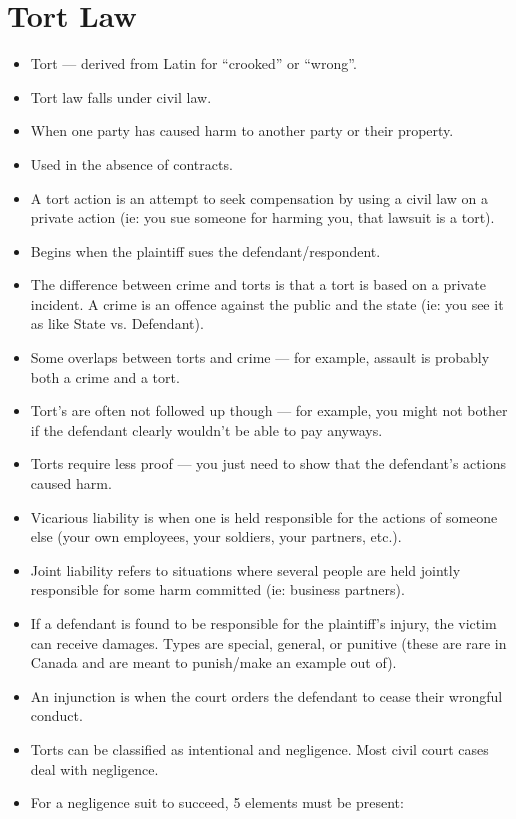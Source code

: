 \documentclass{article}
\begin{document}
\section{Tort Law}
\begin{itemize}
    \item Tort --- derived from Latin for ``crooked'' or ``wrong''.
    \item Tort law falls under civil law.
    \item When one party has caused harm to another party or their property.
    \item Used in the absence of contracts.
    \item A tort action is an attempt to seek compensation by using a civil law on a private action (ie: you sue someone for harming you, that lawsuit is a tort).
    \item Begins when the plaintiff sues the defendant/respondent.
    \item The difference between crime and torts is that a tort is based on a private incident.  A crime is an offence against the public and the state (ie: you see it as like State vs. Defendant).
    \item Some overlaps between torts and crime --- for example, assault is probably both a crime and a tort.
    \item Tort's are often not followed up though --- for example, you might not bother if the defendant clearly wouldn't be able to pay anyways.
    \item Torts require less proof --- you just need to show that the defendant's actions caused harm.
    \item Vicarious liability is when one is held responsible for the actions of someone else (your own employees, your soldiers, your partners, etc.).
    \item Joint liability refers to situations where several people are held jointly responsible for some harm committed (ie: business partners).
    \item If a defendant is found to be responsible for the plaintiff's injury, the victim can receive damages.  Types are special, general, or punitive (these are rare in Canada and are meant to punish/make an example out of).
    \item An injunction is when the court orders the defendant to cease their wrongful conduct.
    \item Torts can be classified as intentional and negligence.  Most civil court cases deal with negligence.
    \item For a negligence suit to succeed, 5 elements must be present:

\end{itemize}
\end{document}
